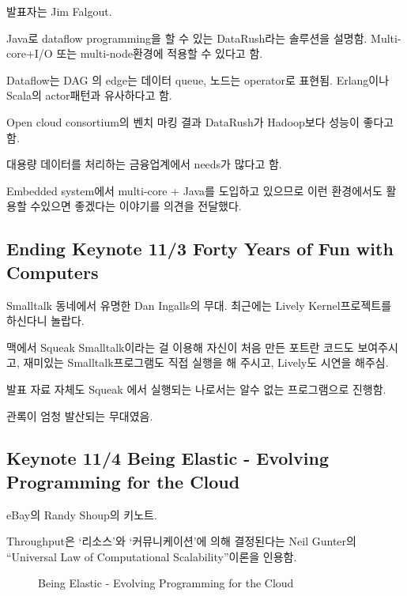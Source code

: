 \documentclass[a4paper]{article}
\begin{document}
발표자는 Jim Falgout.
 
Java로 dataflow programming을 할 수 있는 DataRush라는 솔루션을 설명함.
Multi-core+I/O 또는 multi-node환경에 적용할 수 있다고 함.
 
Dataflow는 DAG 의 edge는 데이터 queue, 노드는 operator로 표현됨.
Erlang이나 Scala의 actor패턴과 유사하다고 함.
 
Open cloud consortium의 벤치 마킹 결과 DataRush가 Hadoop보다 성능이 좋다고 함.
 
대용량 데이터를 처리하는 금융업계에서 needs가 많다고 함. 
 
Embedded system에서 multi-core + Java를 도입하고 있으므로 이런
환경에서도 활용할 수있으면 좋겠다는 이야기를 의견을 전달했다.
 
\subsection{Ending Keynote 11/3 Forty Years of Fun with Computers}
 
Smalltalk 동네에서 유명한 Dan Ingalls의 무대.
최근에는  Lively Kernel프로젝트를 하신다니 놀랍다.
 
맥에서 Squeak Smalltalk이라는 걸 이용해 자신이 처음 만든 포트란 코드도
보여주시고, 재미있는 Smalltalk프로그램도 직접 실행을 해 주시고,
Lively도 시연을 해주심.
 
발표 자료 자체도 Squeak 에서 실행되는 나로서는 알수 없는 프로그램으로
진행함.
 
관록이 엄청 발산되는 무대였음. 
 
\subsection{Keynote 11/4 Being Elastic - Evolving Programming for the Cloud}
 
eBay의 Randy Shoup의 키노트.
 
Throughput은 `리소스'와 `커뮤니케이션'에 의해 결정된다는 Neil Gunter의
``Universal Law of Computational Scalability''이론을 인용함.

\begin{figure}[t]
    \begin{Frame}
        \begin{center}
        \end{center}
    \end{Frame}
    \caption{Being Elastic - Evolving Programming for the Cloud}
    \label{cloud}
\end{figure}
 
\end{document}
